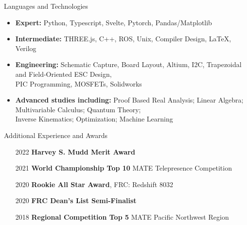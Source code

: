 \documentclass[]{mcdowellcv}
\begin{document}
\begin{cvsection}{Languages and Technologies}
	\begin{cvsubsection}{}{}{}
		\begin{itemize}
			\item \textbf{Expert:} Python, Typescript, Svelte, Pytorch, Pandas/Matplotlib
			\item \textbf{Intermediate:} THREE.js, C++, ROS, Unix, Compiler Design, LaTeX, Verilog
			\item \textbf{Engineering:} Schematic Capture, Board Layout, Altium, I2C,
			      Trapezoidal and Field-Oriented ESC Design, \\ PIC Programming, MOSFETs, Solidworks
			\item \textbf{Advanced studies including:} Proof Based Real Analysis; Linear Algebra; Multivariable Calculus; Quantum Theory; \\ Inverse Kinematics; Optimization; Machine Learning
		\end{itemize}
	\end{cvsubsection}
\end{cvsection}

\begin{cvsection}{Additional Experience and Awards}
	\begin{cvsubsection}{}{}{}
		\begin{itemize}
			\item[2022] \textbf{Harvey S. Mudd Merit Award}
			\item[2021] \textbf{World Championship Top 10} MATE  Telepresence Competition
			\item[2020] \textbf{Rookie All Star Award}, FRC: Redshift 8032
			\item[2020] \textbf{FRC Dean's List Semi-Finalist}
			\item[2018] \textbf{Regional Competition Top 5} MATE Pacific Northwest Region
		\end{itemize}
	\end{cvsubsection}
\end{cvsection}
\end{document}
